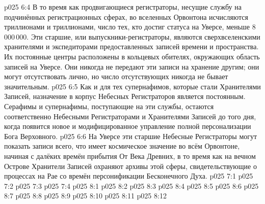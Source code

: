 \vs p025 6:4 В то время как продвигающиеся регистраторы, несущие службу на подчинённых регистрационных сферах, во вселенных Орвонтона исчисляются триллионами и триллионами, число тех, кто достиг статуса на Уверсе, меньше 8\,000\,000. Эти старшие, или выпускники\hyp{}регистраторы, являются сверхвселенскими хранителями и экспедиторами предоставленных записей времени и пространства. Их постоянные центры расположены в кольцевых обителях, окружающих область записей на Уверсе. Они никогда не передают эти записи на хранение другим; они могут отсутствовать лично, но число отсутствующих никогда не бывает значительным.
\vs p025 6:5 Как и для тех супернафимов, которые стали Хранителями Записей, назначение в корпус Небесных Регистраторов является постоянным. Серафимы и супернафимы, поступающие на эти службы, остаются соответственно Небесными Регистраторами и Хранителями Записей до того дня, когда появится новое и модифицированное управление полной персонализации Бога Верховного.
\vs p025 6:6 На Уверсе эти старшие Небесные Регистраторы могут показать записи всего, что имеет космическое значение во всём Орвонтоне, начиная с далёких времён прибытия От Века Древних, в то время как на вечном Острове Хранители Записей охраняют архивы этой сферы, свидетельствующие о процессах на Рае со времён персонификации Бесконечного Духа.
\vs p025 7:1 
\vs p025 7:2 
\vs p025 7:3 
\vs p025 7:4 
\vs p025 8:1 
\vs p025 8:2 
\vs p025 8:3 
\vs p025 8:4 
\vs p025 8:5 \pc 
\vs p025 8:6 
\vs p025 8:7 
\vs p025 8:8 \pc 
\vs p025 8:9 \pc 
\vs p025 8:10 
\vs p025 8:11 
\vsetoff
\vs p025 8:12 
\quizlink
